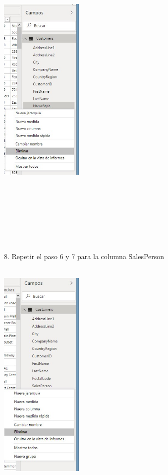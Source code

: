 \documentclass[12pt,letterpaper]{article}
\begin{document}
\begin{flushleft}
\begin{itemize}
\textbf{ }\\
\begin{center}
	\includegraphics[width=4cm]{./Imagenes/image9} 
	\end{center}
\textbf{ }\\


\textbf{ }\\
\textbf{ }\\
\textbf{ }\\
\textbf{ }\\
\textbf{ }\\
\textbf{ }\\
8. Repetir el paso 6 y 7 para la columna SalesPerson\\
\textbf{ }\\
\begin{center}
	\includegraphics[width=4cm]{./Imagenes/image10} 
	\end{center}
\textbf{ }\\


\end{itemize}
\end{flushleft}
\end{document}
